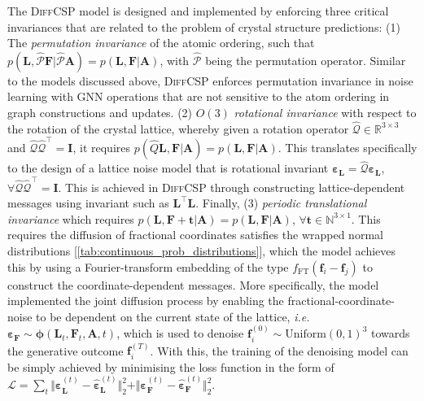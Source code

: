 The \textsc{DiffCSP} model is designed and implemented by enforcing three critical invariances that are related to the problem of crystal structure predictions: (1) The \emph{permutation invariance} of the atomic ordering, such that $p(\bm{L},\hat{\mathcal{P}}\bm{F}|\hat{\mathcal{P}}\bm{A})=p(\bm{L},\bm{F}|\bm{A})$, with $\hat{\mathcal{P}}$ being the permutation operator. Similar to the models discussed above,\cite{simonovsky2018graphvae,niu2020permutation} \textsc{DiffCSP} enforces permutation invariance in noise learning with GNN operations that are not sensitive to the atom ordering in graph constructions and updates. (2) $O(3)$ \textit{rotational invariance} with respect to the rotation of the crystal lattice, whereby given a rotation operator $\hat{\mathcal{Q}}\in\mathbb{R}^{3\times3}$ and $\hat{\mathcal{Q}}\hat{\mathcal{Q}}^\top=\bm{I}$, it requires $p(\hat{Q}\bm{L},\bm{F}|\bm{A})=p(\bm{L},\bm{F}|\bm{A})$. This translates specifically to the design of a lattice noise model that is rotational invariant $\boldsymbol{\varepsilon}_\bm{L}=\hat{\mathcal{Q}}\boldsymbol{\varepsilon}_\bm{L}$, $\forall\hat{\mathcal{Q}}\hat{\mathcal{Q}}^\top=\bm{I}$. This is achieved in \textsc{DiffCSP} through constructing lattice-dependent messages using invariant such as $\bm{L}^\top\bm{L}$. Finally, (3) \emph{periodic translational invariance} which requires $p(\bm{L},\bm{F}+\bm{t}|\bm{A})=p(\bm{L},\bm{F}|\bm{A})$, $\forall \bm{t}\in\mathbb{N}^{3\times1}$. This requires the diffusion of fractional coordinates satisfies the wrapped normal distributions [\cref{tab:continuous_prob_distributions}], which the model achieves this by using a Fourier-transform embedding of the type $f_{\mathrm{FT}}(\bm{f}_i-\bm{f}_j)$ to construct the coordinate-dependent messages. More specifically, the model implemented the joint diffusion process by enabling the fractional-coordinate-noise to be dependent on the current state of the lattice, \emph{i.e.} $\boldsymbol{\varepsilon}_\bm{F}\sim\boldsymbol{\phi}(\bm{L}_{t},\bm{F}_{t},\bm{A},t)$, which is used to denoise $\bm{f}_i^{(0)}\sim\mathrm{Uniform}(0,1)^3$ towards the generative outcome $\bm{f}_i^{(T)}$. With this, the training of the denoising model can be simply achieved by minimising the loss function in the form of $\mathcal{L}=\sum_t\Vert \boldsymbol{\varepsilon}_\bm{L}^{(t)}-\hat{\boldsymbol{\varepsilon}}_\bm{L}^{(t)}\Vert_2^2+\Vert \boldsymbol{\varepsilon}_\bm{F}^{(t)}-\hat{\boldsymbol{\varepsilon}}_\bm{F}^{(t)}\Vert_2^2$. 

